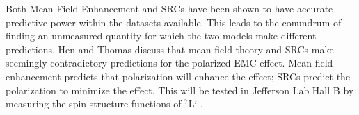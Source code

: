 Both Mean Field Enhancement and SRCs have been shown to have accurate predictive power within the datasets available. This leads to the conundrum of finding an unmeasured quantity for which the two models make different predictions. Hen \cite{HenSRC} and Thomas \cite{ThomasSRC} discuss that mean field theory and SRCs make seemingly contradictory predictions for the polarized EMC effect. Mean field enhancement predicts that polarization will enhance the effect; SRCs predict the polarization to minimize the effect. This will be tested in Jefferson Lab Hall B by measuring the spin structure functions of $^7$Li \cite{CLASspinEMC}.